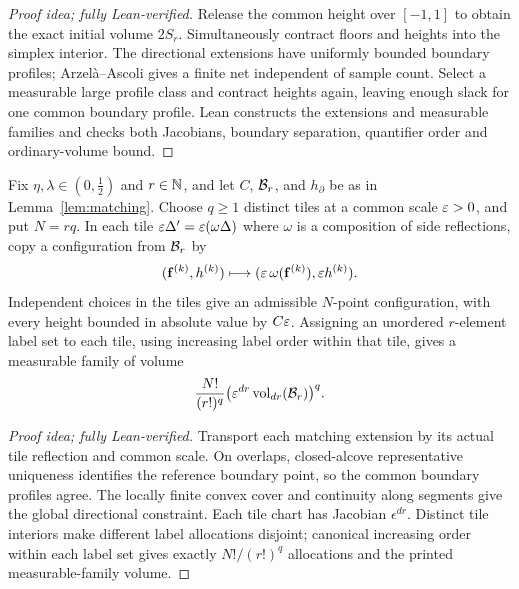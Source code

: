 \documentclass[11pt,letterpaper]{article}
\begin{document}
\begin{proof}[Proof idea; fully Lean-verified]
Release the common height over $[-1,1]$ to obtain the exact initial volume $2S_r$. Simultaneously contract floors and heights into the simplex interior. The directional extensions have uniformly bounded boundary profiles; Arzel\`a--Ascoli gives a finite net independent of sample count. Select a measurable large profile class and contract heights again, leaving enough slack for one common boundary profile. Lean constructs the extensions and measurable families and checks both Jacobians, boundary separation, quantifier order and ordinary-volume bound.
\end{proof}




\begin{lemma}\label{lem:replication}
      Fix $\eta,\lambda\in(0,\frac12)$ and $r\in\mathbb N$, and let $C$, $\mathcal B_r$, and $h_\partial$ be as in Lemma~\ref{lem:matching}. Choose $q\ge1$ distinct tiles at a common scale $\varepsilon>0$, and put $N=rq$. In each tile $\varepsilon\Delta'=\varepsilon(\omega\Delta)$ where $\omega$ is a composition of side reflections, copy a configuration from $\mathcal B_r$ by
      \[
            (\mathbf f^{(k)},h^{(k)})\longmapsto(\varepsilon\,\omega(\mathbf f^{(k)}),\varepsilon h^{(k)}).
      \]
      Independent choices in the tiles give an admissible $N$-point configuration, with every height bounded in absolute value by $C\varepsilon$. Assigning an unordered $r$-element label set to each tile, using increasing label order within that tile, gives a measurable family of volume
      \begin{equation}\label{eq:replication}
            \frac{N!}{(r!)^q}\bigl(\varepsilon^{dr}\operatorname{vol}_{dr}(\mathcal B_r)\bigr)^q.
      \end{equation}
\end{lemma}

\begin{proof}[Proof idea; fully Lean-verified]
Transport each matching extension by its actual tile reflection and common scale. On overlaps, closed-alcove representative uniqueness identifies the reference boundary point, so the common boundary profiles agree. The locally finite convex cover and continuity along segments give the global directional constraint. Each tile chart has Jacobian $\epsilon^{dr}$. Distinct tile interiors make different label allocations disjoint; canonical increasing order within each label set gives exactly $N!/(r!)^q$ allocations and the printed measurable-family volume.
\end{proof}
\end{document}
